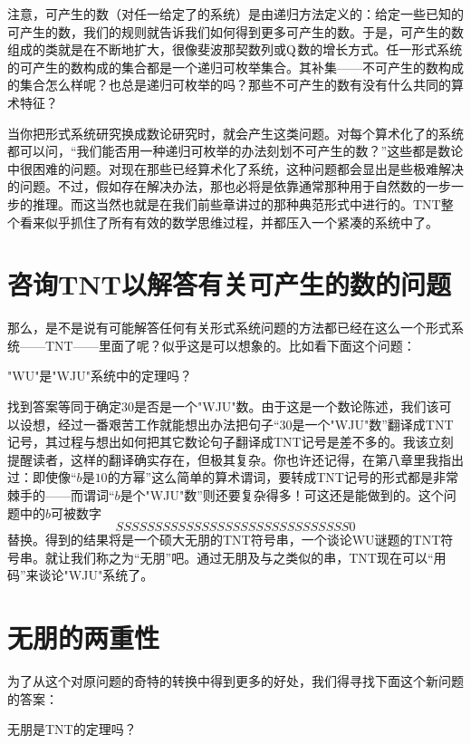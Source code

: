 注意，可产生的数（对任一给定了的系统）是由递归方法定义的：给定一些已知的可产生的数，我们的规则就告诉我们如何得到更多可产生的数。于是，可产生的数组成的类就是在不断地扩大，很像斐波那契数列或$\operatorname{Q}$数的增长方式。任一形式系统的可产生的数构成的集合都是一个递归可枚举集合。其补集——不可产生的数构成的集合怎么样呢？也总是递归可枚举的吗？那些不可产生的数有没有什么共同的算术特征？

当你把形式系统研究换成数论研究时，就会产生这类问题。对每个算术化了的系统都可以问，“我们能否用一种递归可枚举的办法刻划不可产生的数？”这些都是数论中很困难的问题。对现在那些已经算术化了系统，这种问题都会显出是些极难解决的问题。不过，假如存在解决办法，那也必将是依靠通常那种用于自然数的一步一步的推理。而这当然也就是在我们前些章讲过的那种典范形式中进行的。TNT整个看来似乎抓住了所有有效的数学思维过程，并都压入一个紧凑的系统中了。

\section{咨询TNT以解答有关可产生的数的问题}

那么，是不是说有可能解答任何有关形式系统问题的方法都已经在这么一个形式系统——TNT——里面了呢？似乎这是可以想象的。比如看下面这个问题：

\begin{block}
"WU"是"WJU"系统中的定理吗？
\end{block}
找到答案等同于确定$30$是否是一个"WJU"数。由于这是一个数论陈述，我们该可以设想，经过一番艰苦工作就能想出办法把句子“$30$是一个"WJU"数”翻译成TNT记号，其过程与想出如何把其它数论句子翻译成TNT记号是差不多的。我该立刻提醒读者，这样的翻译确实存在，但极其复杂。你也许还记得，在第八章里我指出过：即使像“$b$是$10$的方幂”这么简单的算术谓词，要转成TNT记号的形式都是非常棘手的——而谓词“$b$是个"WJU"数”则还要复杂得多！可这还是能做到的。这个问题中的$b$可被数字
\[
SSSSSSSSSSSSSSSSSSSSSSSSSSSSSS0
\]
替换。得到的结果将是一个硕大无朋的TNT符号串，一个谈论WU谜题的TNT符号串。就让我们称之为“无朋”吧。通过无朋及与之类似的串，TNT现在可以“用码”来谈论"WJU"系统了。

\section{无朋的两重性}

为了从这个对原问题的奇特的转换中得到更多的好处，我们得寻找下面这个新问题的答案：

\begin{block}
无朋是TNT的定理吗？
\end{block}

